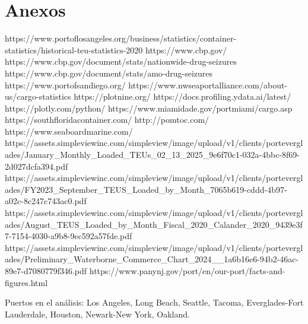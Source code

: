 \documentclass{article}
\begin{document}
\section{Anexos}
https://www.portoflosangeles.org/business/statistics/container-statistics/historical-teu-statistics-2020
https://www.cbp.gov/
https://www.cbp.gov/document/stats/nationwide-drug-seizures
https://www.cbp.gov/document/stats/amo-drug-seizures
https://www.portofsandiego.org/
https://www.nwseaportalliance.com/about-us/cargo-statistics
https://plotnine.org/
https://docs.profiling.ydata.ai/latest/
https://plotly.com/python/
https://www.miamidade.gov/portmiami/cargo.asp
https://southfloridacontainer.com/
http://pomtoc.com/
https://www.seaboardmarine.com/
https://assets.simpleviewinc.com/simpleview/image/upload/v1/clients/porteverglades/January_Monthly_Loaded_TEUs_02_13_2025_9e6f70c1-032a-4bbc-8f69-2d027dcfa394.pdf
https://assets.simpleviewinc.com/simpleview/image/upload/v1/clients/porteverglades/FY2023_September_TEUS_Loaded_by_Month_7065b619-cddd-4b97-a02c-8c247c743ac0.pdf
https://assets.simpleviewinc.com/simpleview/image/upload/v1/clients/porteverglades/August_TEUS_Loaded_by_Month_Fiscal_2020_Calander_2020_9439e3f7-7154-4030-a9b8-9ec592a57fde.pdf
https://assets.simpleviewinc.com/simpleview/image/upload/v1/clients/porteverglades/Preliminary_Waterborne_Commerce_Chart_2024__1a6b16e6-94b2-46ac-89e7-d7080779f346.pdf
https://www.panynj.gov/port/en/our-port/facts-and-figures.html

Puertos en el análisis: Los Angeles, Long Beach, Seattle, Tacoma, Everglades-Fort Lauderdale, Houston, Newark-New York, Oakland.
\end{document}
